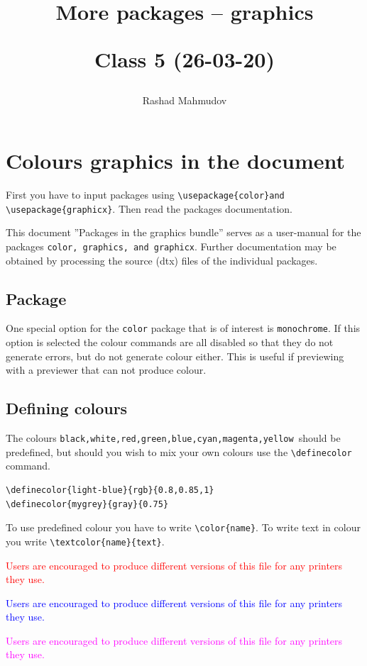 \documentclass{article}
\title{More packages – \textbf{graphics} 

Class 5 (26-03-20)}
\author{Rashad Mahmudov}
\date{}
\begin{document}
\maketitle
\section*{Colours graphics in the document}
First you have to input packages using
\verb|\usepackage{color}and \usepackage{graphicx}|.
Then read the packages documentation.

This document ”Packages in the graphics bundle” serves as a user-manual
for the packages \verb|color, graphics, and graphicx|. Further documentation may
be obtained by processing the source (dtx) files of the individual packages.

\subsection*{Package }
One special option for the \verb|color| package that is of interest is \verb|monochrome|. If
this option is selected the colour commands are all disabled so that they do not
generate errors, but do not generate colour either. This is useful if previewing
with a previewer that can not produce colour.

\subsection*{Defining colours}
The colours \verb|black,white,red,green,blue,cyan,magenta,yellow |should be predefined, but should you wish to mix your own colours use the \verb|\definecolor| command.

\begin{verbatim}
\definecolor{light-blue}{rgb}{0.8,0.85,1}
\definecolor{mygrey}{gray}{0.75}
\end{verbatim}

To use predefined colour you have to write \verb|\color{name}|. To write text in colour you write \verb|\textcolor{name}{text}|.

\textcolor{red}{Users are encouraged to produce different versions of this file for any printers they use.}

\textcolor{blue}{Users are encouraged to produce different versions of this file for any printers they use.}

\textcolor{magenta}{Users are encouraged to produce different versions of this file for any printers they use.}
\end{document}
